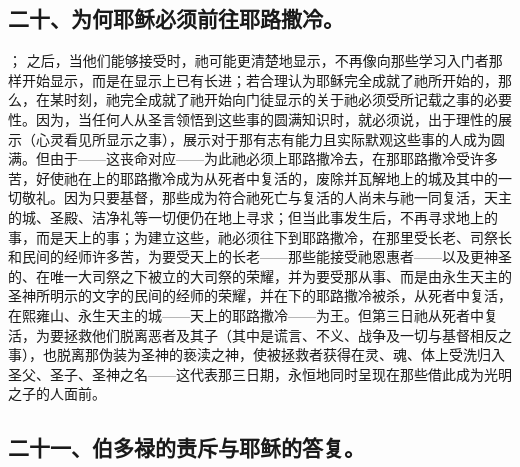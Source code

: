 
\subsection{二十、为何耶稣必须前往耶路撒冷。}

； 之后，当他们能够接受时，祂可能更清楚地显示，不再像向那些学习入门者那样开始显示，而是在显示上已有长进；若合理认为耶稣完全成就了祂所开始的，那么，在某时刻，祂完全成就了祂开始向门徒显示的关于祂必须受所记载之事的必要性。因为，当任何人从圣言领悟到这些事的圆满知识时，就必须说，出于理性的展示（心灵看见所显示之事），展示对于那有志有能力且实际默观这些事的人成为圆满。但由于——这丧命对应——为此祂必须上耶路撒冷去，在那耶路撒冷受许多苦，好使祂在上的耶路撒冷成为从死者中复活的，废除并瓦解地上的城及其中的一切敬礼。因为只要基督，那些成为符合祂死亡与复活的人尚未与祂一同复活，天主的城、圣殿、洁净礼等一切便仍在地上寻求；但当此事发生后，不再寻求地上的事，而是天上的事；为建立这些，祂必须往下到耶路撒冷，在那里受长老、司祭长和民间的经师许多苦，为要受天上的长老——那些能接受祂恩惠者——以及更神圣的、在唯一大司祭之下被立的大司祭的荣耀，并为要受那从事、而是由永生天主的圣神所明示的文字的民间的经师的荣耀，并在下的耶路撒冷被杀，从死者中复活，在熙雍山、永生天主的城——天上的耶路撒冷——为王。但第三日祂从死者中复活，为要拯救他们脱离恶者及其子（其中是谎言、不义、战争及一切与基督相反之事），也脱离那伪装为圣神的亵渎之神，使被拯救者获得在灵、魂、体上受洗归入圣父、圣子、圣神之名——这代表那三日期，永恒地同时呈现在那些借此成为光明之子的人面前。\par


\subsection{二十一、伯多禄的责斥与耶稣的答复。}

